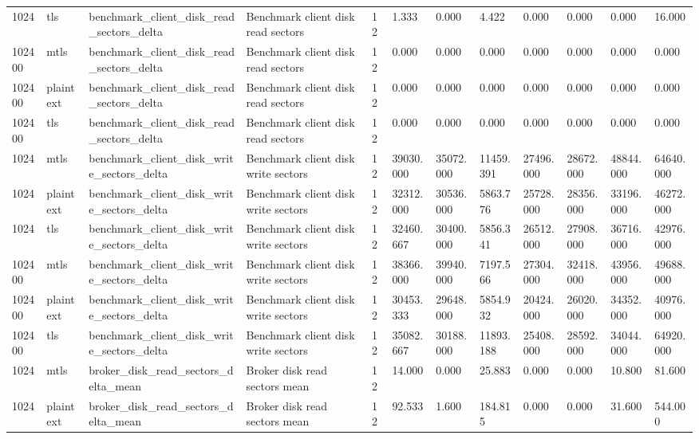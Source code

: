 \begin{longtable}{llllllllllll}
1024 & tls & benchmark\_client\_disk\_read\_sectors\_delta & Benchmark client disk read sectors & 12 & 1.333 & 0.000 & 4.422 & 0.000 & 0.000 & 0.000 & 16.000 \\
102400 & mtls & benchmark\_client\_disk\_read\_sectors\_delta & Benchmark client disk read sectors & 12 & 0.000 & 0.000 & 0.000 & 0.000 & 0.000 & 0.000 & 0.000 \\
102400 & plaintext & benchmark\_client\_disk\_read\_sectors\_delta & Benchmark client disk read sectors & 12 & 0.000 & 0.000 & 0.000 & 0.000 & 0.000 & 0.000 & 0.000 \\
102400 & tls & benchmark\_client\_disk\_read\_sectors\_delta & Benchmark client disk read sectors & 12 & 0.000 & 0.000 & 0.000 & 0.000 & 0.000 & 0.000 & 0.000 \\
1024 & mtls & benchmark\_client\_disk\_write\_sectors\_delta & Benchmark client disk write sectors & 12 & 39030.000 & 35072.000 & 11459.391 & 27496.000 & 28672.000 & 48844.000 & 64640.000 \\
1024 & plaintext & benchmark\_client\_disk\_write\_sectors\_delta & Benchmark client disk write sectors & 12 & 32312.000 & 30536.000 & 5863.776 & 25728.000 & 28356.000 & 33196.000 & 46272.000 \\
1024 & tls & benchmark\_client\_disk\_write\_sectors\_delta & Benchmark client disk write sectors & 12 & 32460.667 & 30400.000 & 5856.341 & 26512.000 & 27908.000 & 36716.000 & 42976.000 \\
102400 & mtls & benchmark\_client\_disk\_write\_sectors\_delta & Benchmark client disk write sectors & 12 & 38366.000 & 39940.000 & 7197.566 & 27304.000 & 32418.000 & 43956.000 & 49688.000 \\
102400 & plaintext & benchmark\_client\_disk\_write\_sectors\_delta & Benchmark client disk write sectors & 12 & 30453.333 & 29648.000 & 5854.932 & 20424.000 & 26020.000 & 34352.000 & 40976.000 \\
102400 & tls & benchmark\_client\_disk\_write\_sectors\_delta & Benchmark client disk write sectors & 12 & 35082.667 & 30188.000 & 11893.188 & 25408.000 & 28592.000 & 34044.000 & 64920.000 \\
1024 & mtls & broker\_disk\_read\_sectors\_delta\_mean & Broker disk read sectors mean & 12 & 14.000 & 0.000 & 25.883 & 0.000 & 0.000 & 10.800 & 81.600 \\
1024 & plaintext & broker\_disk\_read\_sectors\_delta\_mean & Broker disk read sectors mean & 12 & 92.533 & 1.600 & 184.815 & 0.000 & 0.000 & 31.600 & 544.000 \\

\end{longtable}
